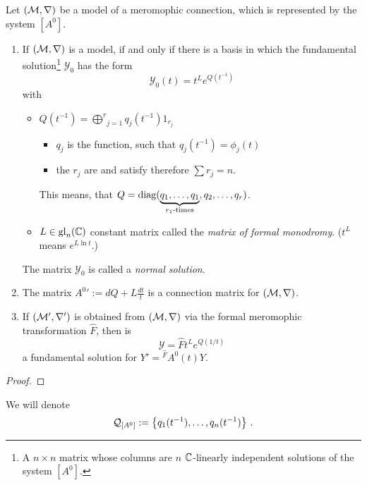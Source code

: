 \begin{lem}
  Let $(\mathcal{M},\nabla)$ be a model of a meromophic connection, which is
  represented by the system $[A^0]$.
  \begin{enumerate}
    \item 
      If $(\mathcal{M},\nabla)$ is a model, if and only if there is a basis in which
      the fundamental solution\footnote{A $n\times n$ matrix whose
      columns are $n$ $\mathbb{C}$-linearly independent solutions of the system
      $[A^0]$.} $\mathcal{Y}_0$ has the form
      \[
        \mathcal{Y}_0(t)=t^L e^{Q(t^{-1})}
      \]
      with
      \begin{itemize}
        \item
          $Q(t^{-1})=\underset{j=1}{\overset{r}{\bigoplus}}q_j(t^{-1})1_{r_j}$
          \begin{itemize}
            \item $q_j$ is the function, such that $q_j(t^{-1})=\phi_j(t)$
            \item the $r_j$ are \TODO and satisfy therefore $\sum r_j=n$.
          \end{itemize}
          This means, that $Q=\diag(\underset{r_1\text{-times}}{\underbrace{%
            q_1,\dots,q_1}},q_2,\dots,q_r)$.
        \item $L\in\operatorname{gl}_n(\mathbb{C})$ constant matrix called the \emph{matrix of
          formal monodromy}. ($t^L$ means $e^{L\ln t}$.)
      \end{itemize}
      The matrix $\mathcal{Y}_0$ is called a \emph{normal solution}.
    \item The matrix ${A^0}':=dQ+L\frac{dt}{t}$ is a connection matrix for
      $(\mathcal{M},\nabla)$.
    \item If $(\mathcal{M}',\nabla')$ is obtained from $(\mathcal{M},\nabla)$ via the formal
      meromophic transformation $\hat F$, then is
      \[
        \mathcal{Y}=\hat F t^L e^{Q(1/t)}
      \]
      a fundamental solution for $Y'={}^{\hat F}\!A^0(t)Y$.
  \end{enumerate}
\end{lem}
\begin{proof}
  \TODO{}
\end{proof}
We will denote
\[
  \mathcal{Q}_{[A^0]}:=\left\{q_1(t^{-1}),\dots,q_n(t^{-1})\right\} \,.
\]

